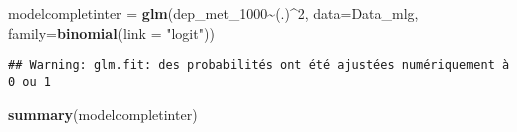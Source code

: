 \documentclass[
]{article}
\newenvironment{Shaded}{\begin{snugshade}}{\end{snugshade}}
\newcommand{\AttributeTok}[1]{\textcolor[rgb]{0.13,0.29,0.53}{#1}}
\newcommand{\DecValTok}[1]{\textcolor[rgb]{0.00,0.00,0.81}{#1}}
\newcommand{\FunctionTok}[1]{\textcolor[rgb]{0.13,0.29,0.53}{\textbf{#1}}}
\newcommand{\NormalTok}[1]{#1}
\newcommand{\OtherTok}[1]{\textcolor[rgb]{0.56,0.35,0.01}{#1}}
\newcommand{\SpecialCharTok}[1]{\textcolor[rgb]{0.81,0.36,0.00}{\textbf{#1}}}
\newcommand{\StringTok}[1]{\textcolor[rgb]{0.31,0.60,0.02}{#1}}
\begin{document}
\begin{Shaded}
\begin{Highlighting}[]
\NormalTok{modelcompletinter }\OtherTok{=} \FunctionTok{glm}\NormalTok{(dep\_met\_1000}\SpecialCharTok{\textasciitilde{}}\NormalTok{(.)}\SpecialCharTok{\^{}}\DecValTok{2}\NormalTok{, }\AttributeTok{data=}\NormalTok{Data\_mlg, }\AttributeTok{family=}\FunctionTok{binomial}\NormalTok{(}\AttributeTok{link =} \StringTok{"logit"}\NormalTok{))}
\end{Highlighting}
\end{Shaded}

\begin{verbatim}
## Warning: glm.fit: des probabilités ont été ajustées numériquement à 0 ou 1
\end{verbatim}

\begin{Shaded}
\begin{Highlighting}[]
\FunctionTok{summary}\NormalTok{(modelcompletinter)}
\end{Highlighting}
\end{Shaded}
\end{document}
